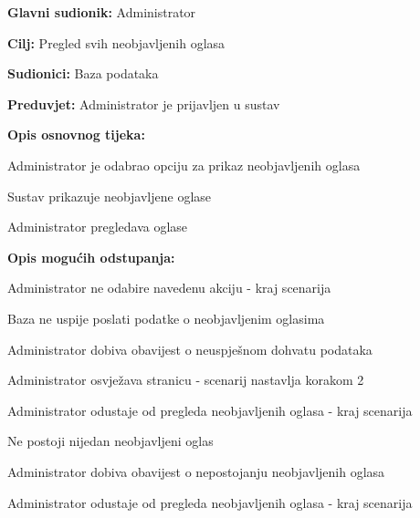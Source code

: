 					\noindent {}
					\begin{packed_item}
	
						\item \textbf{Glavni sudionik: }Administrator
						\item  \textbf{Cilj:} Pregled svih neobjavljenih oglasa
						\item  \textbf{Sudionici:} Baza podataka
						\item  \textbf{Preduvjet:} Administrator je prijavljen u sustav
						\item  \textbf{Opis osnovnog tijeka:}
						
						\item[] \begin{packed_enum}
							\item Administrator je odabrao opciju za prikaz neobjavljenih oglasa
							\item Sustav prikazuje neobjavljene oglase
							\item Administrator pregledava oglase
						\end{packed_enum}
						\item  \textbf{Opis mogućih odstupanja:}

						\item[] \begin{packed_item}
							\item[1.a] Administrator ne odabire navedenu akciju - kraj scenarija
							\item[2.a] Baza ne uspije poslati podatke o neobjavljenim oglasima
							\item[] \begin{packed_enum}
								
								\item Administrator dobiva obavijest o neuspješnom dohvatu podataka
								\item
									\begin{packed_enum}
										\item Administrator osvježava stranicu - scenarij nastavlja korakom 2
										\item Administrator odustaje od pregleda neobjavljenih oglasa - kraj scenarija
									\end{packed_enum}
							
							\end{packed_enum}	
							\item[2.b] Ne postoji nijedan neobjavljeni oglas
							\item[] \begin{packed_enum}
								
								\item Administrator dobiva obavijest o nepostojanju neobjavljenih oglasa
								\item Administrator odustaje od pregleda neobjavljenih oglasa - kraj scenarija
							
							\end{packed_enum}
						\end{packed_item}	
					\end{packed_item}
					
